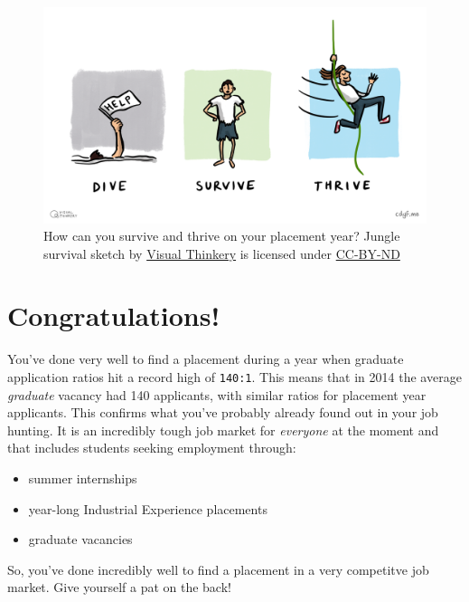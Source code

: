 \documentclass[
]{book}
\providecommand{\tightlist}{%
  \setlength{\itemsep}{0pt}\setlength{\parskip}{0pt}}
\begin{document}
\begin{figure}

{\centering \includegraphics[width=1\linewidth]{images/DiveThriveSurvive} 

}

\caption{How can you survive and thrive on your placement year? Jungle survival sketch by \href{https://visualthinkery.com}{Visual Thinkery} is licensed under \href{https://creativecommons.org/licenses/by-nd/4.0/}{CC-BY-ND}}\label{fig:survival-fig}
\end{figure}



\section{Congratulations!}\label{congrats}

You've done very well to find a placement during a year when graduate application ratios hit a record high of \texttt{140:1}. This means that in 2014 the average \emph{graduate} vacancy had 140 applicants, with similar ratios for placement year applicants. \citep{ratio} This confirms what you've probably already found out in your job hunting. It is an incredibly tough job market for \emph{everyone} at the moment and that includes students seeking employment through:

\begin{itemize}
\tightlist
\item
  summer internships
\item
  year-long Industrial Experience placements
\item
  graduate vacancies
\end{itemize}

So, you've done incredibly well to find a placement in a very competitve job market. Give yourself a pat on the back!
\end{document}
